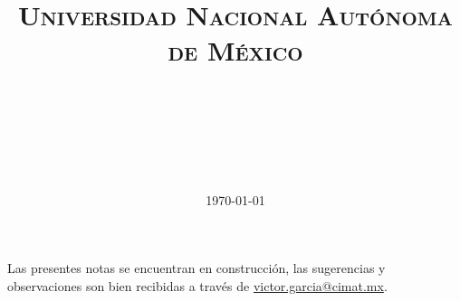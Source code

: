 \documentclass[paper=a4, fontsize=11pt]{scrartcl}
\title{
\normalfont\normalsize
\textsc{Universidad Nacional Autónoma de México} \\[25pt]
\horrule{0.5pt} \\[0.4cm]
\huge \titulo\\[25pt]
\horrule{2pt} \\[0.5cm]
}
\author{\autor}
\date{\normalsize\today}
\numberwithin{equation}{subsection}
\numberwithin{figure}{subsection}
\numberwithin{table}{subsection}
\theoremstyle{definition}
\begin{document}


Las presentes notas se encuentran en construcción, las sugerencias y observaciones son bien recibidas a través de \href{mailto:victor.garcia@cimat.mx}{victor.garcia@cimat.mx}.











%



\end{document}
